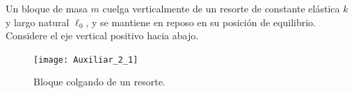 \documentclass[
  11pt,
  letterpaper,
   addpoints,
   answers
  ]{exam}
\begin{document}
\begin{questions}
\question Un bloque de masa $m$ cuelga verticalmente de un resorte de constante elástica $k$ y largo natural $\ell_0$, y se mantiene en reposo en su posición de equilibrio. Considere el eje vertical positivo hacia abajo.
\begin{figure}[H]
  \centering
  \texttt{[image: Auxiliar\_2\_1]}
  \caption{Bloque colgando de un resorte.}
  \label{fig:spring_block}
\end{figure}
\begin{solution}

\end{solution}
\end{questions}
\end{document}
